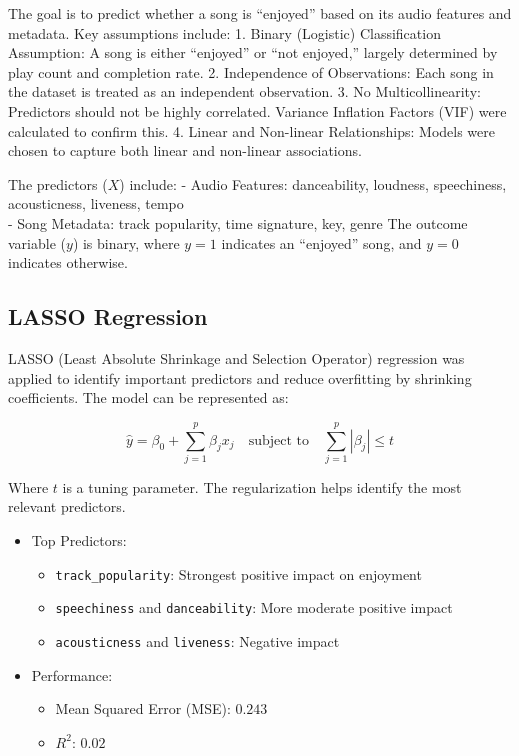 \documentclass[11pt]{article}
\providecommand{\tightlist}{%
  \setlength{\itemsep}{0pt}\setlength{\parskip}{0pt}}
\begin{document}
The goal is to predict whether a song is ``enjoyed'' based on its audio
features and metadata. Key assumptions include: 1. Binary (Logistic)
Classification Assumption: A song is either ``enjoyed'' or ``not
enjoyed,'' largely determined by play count and completion rate. 2.
Independence of Observations: Each song in the dataset is treated as an
independent observation. 3. No Multicollinearity: Predictors should not
be highly correlated. Variance Inflation Factors (VIF) were calculated
to confirm this. 4. Linear and Non-linear Relationships: Models were
chosen to capture both linear and non-linear associations.

The predictors (\(X\)) include: - Audio Features: danceability,
loudness, speechiness, acousticness, liveness, tempo\\
- Song Metadata: track popularity, time signature, key, genre The
outcome variable (\(y\)) is binary, where \(y = 1\) indicates an
``enjoyed'' song, and \(y = 0\) indicates otherwise.

\subsection{LASSO Regression}\label{lasso-regression}

LASSO (Least Absolute Shrinkage and Selection Operator) regression was
applied to identify important predictors and reduce overfitting by
shrinking coefficients. The model can be represented as:

\[
\hat{y} = \beta_0 + \sum_{j=1}^p \beta_j x_j \quad \text{subject to} \quad \sum_{j=1}^p |\beta_j| \leq t
\]

Where \(t\) is a tuning parameter. The regularization helps identify the
most relevant predictors.

\begin{itemize}
\tightlist
\item
  Top Predictors:

  \begin{itemize}
  \tightlist
  \item
    \texttt{track\_popularity}: Strongest positive impact on enjoyment\\
  \item
    \texttt{speechiness} and \texttt{danceability}: More moderate
    positive impact\\
  \item
    \texttt{acousticness} and \texttt{liveness}: Negative impact
  \end{itemize}
\item
  Performance:

  \begin{itemize}
  \tightlist
  \item
    Mean Squared Error (MSE): \(0.243\)\\
  \item
    \(R^2\): \(0.02\)
  \end{itemize}
\end{itemize}
\end{document}
